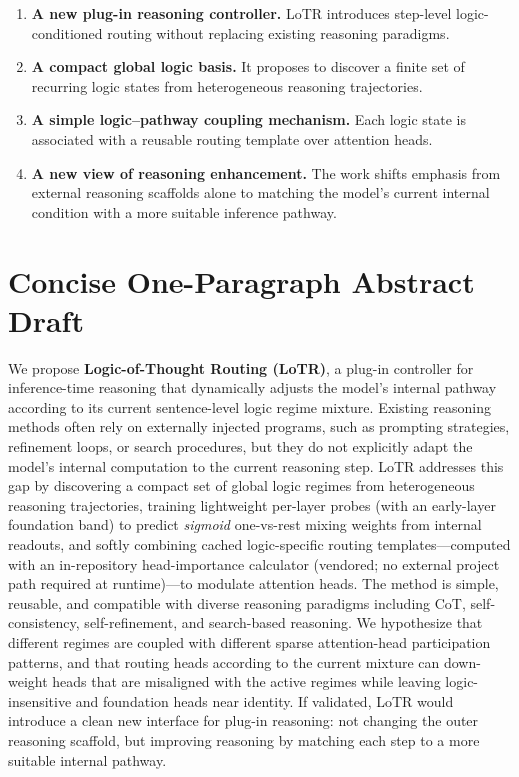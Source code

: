 \documentclass[11pt]{article}
\begin{document}
\begin{enumerate}[leftmargin=1.5em]
    \item \textbf{A new plug-in reasoning controller.}  
    LoTR introduces step-level logic-conditioned routing without replacing existing reasoning paradigms.
    
    \item \textbf{A compact global logic basis.}  
    It proposes to discover a finite set of recurring logic states from heterogeneous reasoning trajectories.
    
    \item \textbf{A simple logic--pathway coupling mechanism.}  
    Each logic state is associated with a reusable routing template over attention heads.
    
    \item \textbf{A new view of reasoning enhancement.}  
    The work shifts emphasis from external reasoning scaffolds alone to matching the model's current internal condition with a more suitable inference pathway.
\end{enumerate}

\section{Concise One-Paragraph Abstract Draft}

We propose \textbf{Logic-of-Thought Routing (LoTR)}, a plug-in controller for inference-time reasoning that dynamically adjusts the model's internal pathway according to its current sentence-level logic regime mixture. Existing reasoning methods often rely on externally injected programs, such as prompting strategies, refinement loops, or search procedures, but they do not explicitly adapt the model's internal computation to the current reasoning step. LoTR addresses this gap by discovering a compact set of global logic regimes from heterogeneous reasoning trajectories, training lightweight per-layer probes (with an early-layer foundation band) to predict \emph{sigmoid} one-vs-rest mixing weights from internal readouts, and softly combining cached logic-specific routing templates---computed with an in-repository head-importance calculator (vendored; no external project path required at runtime)---to modulate attention heads. The method is simple, reusable, and compatible with diverse reasoning paradigms including CoT, self-consistency, self-refinement, and search-based reasoning. We hypothesize that different regimes are coupled with different sparse attention-head participation patterns, and that routing heads according to the current mixture can down-weight heads that are misaligned with the active regimes while leaving logic-insensitive and foundation heads near identity. If validated, LoTR would introduce a clean new interface for plug-in reasoning: not changing the outer reasoning scaffold, but improving reasoning by matching each step to a more suitable internal pathway.
\end{document}
